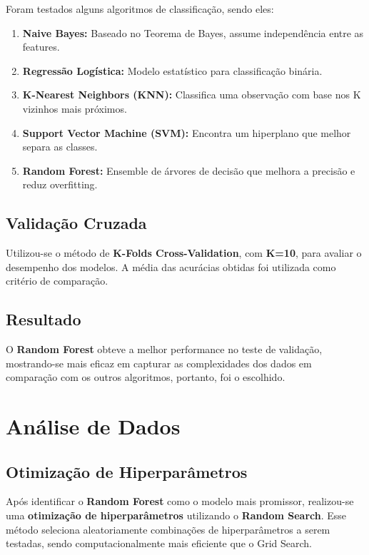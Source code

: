 \documentclass[a4paper,times,12pt]{article}
\begin{document}
\hspace{+15pt}
Foram testados alguns algoritmos de classificação, sendo eles:
\begin{enumerate}
  \item \textbf{Naive Bayes:} Baseado no Teorema de Bayes, assume independência entre as features.
  \item \textbf{Regressão Logística:} Modelo estatístico para classificação binária.
  \item \textbf{K-Nearest Neighbors (KNN):} Classifica uma observação com base nos K vizinhos mais próximos.
  \item \textbf{Support Vector Machine (SVM):} Encontra um hiperplano que melhor separa as classes.
  \item \textbf{Random Forest:} Ensemble de árvores de decisão que melhora a precisão e reduz overfitting.
\end{enumerate}

\subsection{Validação Cruzada}

\hspace{+15pt}
Utilizou-se o método de \textbf{K-Folds Cross-Validation}, com \textbf{K=10}, para avaliar o desempenho dos modelos. A média das acurácias obtidas foi utilizada como critério de comparação.

\subsection{Resultado}

\hspace{+15pt}
O \textbf{Random Forest} obteve a melhor performance no teste de validação, mostrando-se mais eficaz em capturar as complexidades dos dados em comparação com os outros algoritmos, portanto, foi o escolhido.


\section{Análise de Dados}
\subsection{Otimização de Hiperparâmetros}

\hspace{+15pt}
Após identificar o \textbf{Random Forest} como o modelo mais promissor, realizou-se uma \textbf{otimização de hiperparâmetros} utilizando o \textbf{Random Search}. Esse método seleciona aleatoriamente combinações de hiperparâmetros a serem testadas, sendo computacionalmente mais eficiente que o Grid Search.
\end{document}
